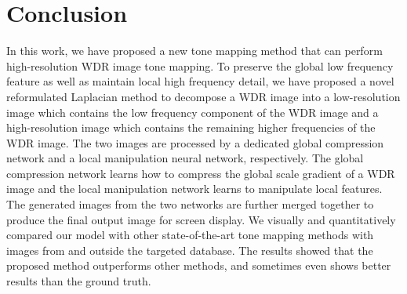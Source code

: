 \documentclass[journal]{IEEEtran}
\begin{document}
\section{Conclusion}
In this work, we have proposed a new tone mapping method that can perform high-resolution WDR image tone mapping. 
To preserve the global low frequency feature as well as maintain local high frequency detail, we have proposed a novel reformulated Laplacian method to decompose a WDR image into a low-resolution image which contains the low frequency component of the WDR image and a high-resolution image which contains the remaining higher frequencies of the WDR image. The two images are processed by a dedicated global compression network and a local manipulation neural network, respectively. The global compression network learns how to compress the global scale gradient of a WDR image and the local manipulation network learns to manipulate local features. The generated images from the two networks are further merged together to produce the final output image for screen display. We visually and quantitatively compared our model with other state-of-the-art tone mapping methods with images from and outside the targeted database. The results showed that the proposed method outperforms other methods, and sometimes even shows better results than the ground truth.






\ifCLASSOPTIONcaptionsoff
  \newpage
\fi





%
%
%
\end{document}
